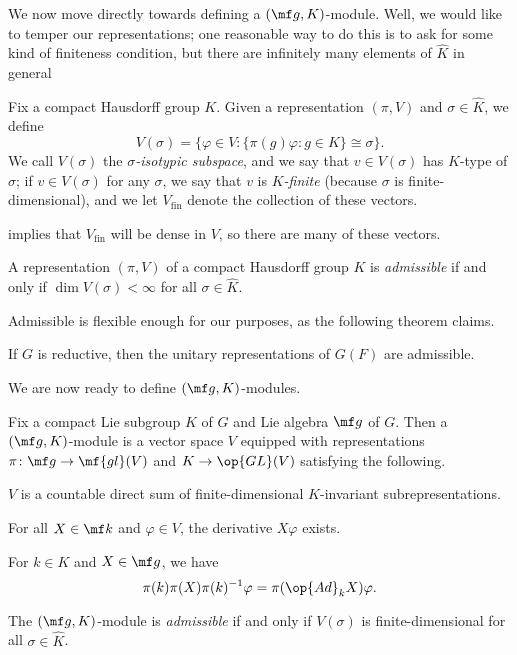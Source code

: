 \documentclass{article}
\begin{document}
We now move directly towards defining a $(\mf g,K)$-module. Well, we would like to temper our representations; one reasonable way to do this is to ask for some kind of finiteness condition, but there are infinitely many elements of $\widehat K$ in general
\begin{definition}
	Fix a compact Hausdorff group $K$. Given a representation $(\pi,V)$ and $\sigma\in\widehat K$, we define
	\[V(\sigma)=\{\varphi\in V:\{\pi(g)\varphi:g\in K\}\cong\sigma\}.\]
	We call $V(\sigma)$ the \textit{$\sigma$-isotypic subspace}, and we say that $v\in V(\sigma)$ has $K$-type of $\sigma$; if $v\in V(\sigma)$ for any $\sigma$, we say that $v$ is \textit{$K$-finite} (because $\sigma$ is finite-dimensional), and we let $V_{\mathrm{fin}}$ denote the collection of these vectors.
\end{definition}
\begin{remark}
	 implies that $V_{\mathrm{fin}}$ will be dense in $V$, so there are many of these vectors.
\end{remark}
\begin{definition}[admissible]
	A representation $(\pi,V)$ of a compact Hausdorff group $K$ is \textit{admissible} if and only if $\dim V(\sigma)<\infty$ for all $\sigma\in\widehat K$.
\end{definition}
Admissible is flexible enough for our purposes, as the following theorem claims.
\begin{theorem}
	If $G$ is reductive, then the unitary representations of $G(F)$ are admissible.
\end{theorem}
We are now ready to define $(\mf g,K)$-modules.
\begin{definition}[$(\mf g,K)$-module]
	Fix a compact Lie subgroup $K$ of $G$ and Lie algebra $\mf g$ of $G$. Then a $(\mf g,K)$-module is a vector space $V$ equipped with representations $\pi\colon\mf g\to\mf{gl}(V)$ and $K\to\op{GL}(V)$ satisfying the following.
	\begin{listalph}
		\item $V$ is a countable direct sum of finite-dimensional $K$-invariant subrepresentations.
		\item For all $X\in\mf k$ and $\varphi\in V$, the derivative $X\varphi$ exists.
		\item For $k\in K$ and $X\in\mf g$, we have
		\[\pi(k)\pi(X)\pi(k)^{-1}\varphi=\pi(\op{Ad}_kX)\varphi.\]
	\end{listalph}
	The $(\mf g,K)$-module is \textit{admissible} if and only if $V(\sigma)$ is finite-dimensional for all $\sigma\in\widehat K$.
\end{definition}
\end{document}
